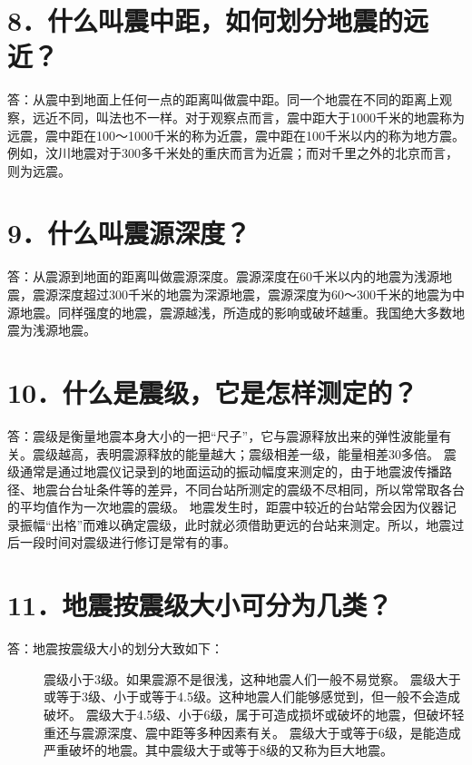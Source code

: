 \documentclass[a4paper,10pt,english]{sphinxmanual}
\begin{document}
\section{8．什么叫震中距，如何划分地震的远近？}
\label{\detokenize{index:id10}}
答：从震中到地面上任何一点的距离叫做震中距。同一个地震在不同的距离上观察，远近不同，叫法也不一样。对于观察点而言，震中距大于1000千米的地震称为远震，震中距在100～1000千米的称为近震，震中距在100千米以内的称为地方震。例如，汶川地震对于300多千米处的重庆而言为近震；而对千里之外的北京而言，则为远震。


\section{9．什么叫震源深度？}
\label{\detokenize{index:id11}}
答：从震源到地面的距离叫做震源深度。震源深度在60千米以内的地震为浅源地震，震源深度超过300千米的地震为深源地震，震源深度为60～300千米的地震为中源地震。同样强度的地震，震源越浅，所造成的影响或破坏越重。我国绝大多数地震为浅源地震。


\section{10．什么是震级，它是怎样测定的？}
\label{\detokenize{index:id12}}
答：震级是衡量地震本身大小的一把“尺子”，它与震源释放出来的弹性波能量有关。震级越高，表明震源释放的能量越大；震级相差一级，能量相差30多倍。
震级通常是通过地震仪记录到的地面运动的振动幅度来测定的，由于地震波传播路径、地震台台址条件等的差异，不同台站所测定的震级不尽相同，所以常常取各台的平均值作为一次地震的震级。
地震发生时，距震中较近的台站常会因为仪器记录振幅“出格”而难以确定震级，此时就必须借助更远的台站来测定。所以，地震过后一段时间对震级进行修订是常有的事。


\section{11．地震按震级大小可分为几类？}
\label{\detokenize{index:id13}}\begin{description}
\item[{答：地震按震级大小的划分大致如下：}] \leavevmode
{} 震级小于3级。如果震源不是很浅，这种地震人们一般不易觉察。
 震级大于或等于3级、小于或等于4.5级。这种地震人们能够感觉到，但一般不会造成破坏。
 震级大于4.5级、小于6级，属于可造成损坏或破坏的地震，但破坏轻重还与震源深度、震中距等多种因素有关。
 震级大于或等于6级，是能造成严重破坏的地震。其中震级大于或等于8级的又称为巨大地震。

\end{description}
\end{document}

